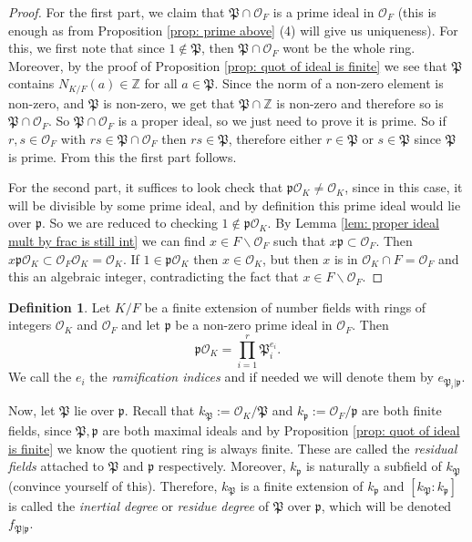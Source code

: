 \documentclass[11pt,a4paper]{report}
\theoremstyle{plain}
\theoremstyle{definition}
\newtheorem{definition}[subsection]{Definition}
\theoremstyle{definition}
\newcommand{\ZZ}{\mathbb{Z}}
\def \gothP{\mathfrak{P}}
\def\gothp{\mathfrak{p}}
\def \OO {\mathcal{O}}
\begin{document}
	
	\begin{proof}
		For the first part, we claim that $\gothP \cap \OO_F$ is a prime ideal in $\OO_F$ (this is enough as from Proposition \ref{prop: prime above} (4) will give us uniqueness). For this, we first note that since $1 \not \in \gothP$, then $\gothP \cap \OO_F$ wont be the whole ring. Moreover, by the proof of Proposition \ref{prop: quot of ideal is finite} we see that $\gothP$ contains $N_{K/F}(a) \in \ZZ$ for all $a \in \gothP$. Since the norm of a non-zero element is non-zero, and $\gothP$ is non-zero, we get that $\gothP \cap \ZZ$ is non-zero and therefore so is $\gothP \cap \OO_F$. So $\gothP \cap \OO_F$ is a proper ideal, so we just need to prove it is prime. So if $r,s \in \OO_F$ with $rs \in \gothP \cap \OO_F$ then $rs \in \gothP$, therefore either $r \in \gothP$ or $s \in \gothP$ since $\gothP$ is prime. From this the first part follows.
		
		For the second part, it suffices to look check that $\gothp\OO_K \neq \OO_K$, since in this case, it will be divisible by some prime ideal, and by definition this prime ideal would lie over $\gothp$. So we are reduced to checking $1 \not \in \gothp\OO_K.$ By Lemma \ref{lem: proper ideal mult by frac is still int} we can find $x \in F \backslash \OO_F$ such that $x \gothp \subset \OO_F$. Then $x\gothp\OO_K \subset \OO_F\OO_K=\OO_K$. If $1 \in \gothp\OO_K$ then $x \in \OO_K$, but then $x$ is in $\OO_K \cap F=\OO_F$ and this an algebraic integer, contradicting the fact that $x \in F \backslash \OO_F$.
		
	\end{proof}
	
	\begin{definition}\label{definition: ram index and inert deg}
		Let $K/F$ be a finite extension of number fields with rings of integers $\OO_K$ and $\OO_F$ and let $\gothp$ be a non-zero prime ideal in $\OO_F$. Then \[\gothp\OO_K= \prod_{i=1}^r \gothP_i^{e_i}.\] We call the $e_i$ the \textit{ramification indices} and if needed we will denote them by $e_{\gothP_i|\gothp}$.
		
		Now, let $\gothP$ lie over $\gothp$. Recall that $k_{\gothP}:=\OO_K/\gothP$ and $k_\gothp:=\OO_F/\gothp$ are both finite fields, since $\gothP,\gothp$ are both maximal ideals and by Proposition \ref{prop: quot of ideal is finite} we know the quotient ring is always finite. These are called the \textit{residual fields} attached to $\gothP$ and $\gothp$ respectively. Moreover, $k_\gothp$ is naturally a subfield of $k_{\gothP}$ (convince yourself of this). Therefore, $k_{\gothP}$  is a finite extension of $k_{\gothp}$ and $[k_{\gothP}:k_{\gothp}]$ is called the \textit{inertial degree} or \textit{residue degree} of $\gothP$ over $\gothp$, which will be denoted $f_{\gothP|\gothp}$.
	\end{definition}
	
\end{document}
